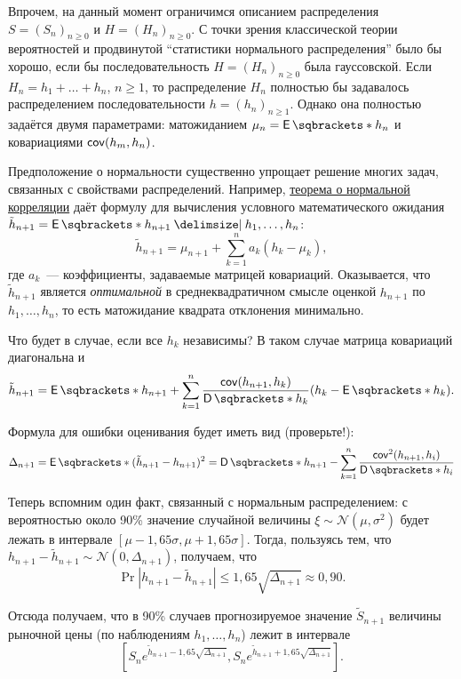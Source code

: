 Впрочем, на данный момент ограничимся описанием распределения \(S = (S_{n})_{n 
\geq 0}\) и \(H = (H_{n})_{n \geq 0}\). С точки зрения классической теории 
вероятностей и продвинутой ``статистики нормального распределения'' было бы 
хорошо, если бы последовательность \(H = (H_{n})_{n \geq 0}\) была гауссовской. 
Если \(H_{n} = h_{1} + \ldots + h_{n}\), \(n \geq 1\), то распределение 
\(H_{n}\) полностью бы задавалось распределением последовательности \(h = 
(h_{n})_{n \geq 1}\). Однако она полностью задаётся двумя параметрами: 
матожиданием \(\mu_{n} = \E{h_{n}}\) и ковариациями \(\operatorname{\mathsf{cov}}(h_{m}, h_{n})\).

Предположение о нормальности существенно упрощает решение многих задач, 
связанных с свойствами распределений. Например, 
\hyperref[normal-correlation-theorem]{теорема о нормальной корреляции} даёт 
формулу для вычисления условного математического ожидания \(\tilde{h}_{n 
+ 1} = \E{h_{n + 1} \given h_{1}, \ldots, h_{n}}\):
\[
	\tilde{h}_{n + 1} = \mu_{n + 1} + \sum_{k = 1}^{n}a_{k}(h_{k} - \mu_{k}),
\] 
где \(a_{k}\)~--- коэффициенты, задаваемые матрицей ковариаций. Оказывается, 
что \(\tilde{h}_{n + 1}\) является \emph{оптимальной} в среднеквадратичном 
смысле оценкой \(h_{n + 1}\) по \(h_{1}, \ldots, h_{n}\), то есть матожидание 
квадрата отклонения минимально.

Что будет в случае, если все \(h_{k}\) независимы? В таком случае матрица 
ковариаций диагональна и
\[
	\tilde{h}_{n + 1} = \E{h_{n + 1}} + \sum_{k = 1}^{n}\frac{\cov(h_{n + 1}, 
	h_{k})}{\D{h_{k}}}(h_{k} - \E{h_{k}}).
\]

Формула для ошибки оценивания будет иметь вид (проверьте!):
\[
	\Delta_{n + 1} = \E{(\tilde{h}_{n + 1} - h_{n + 1})^{2}} = \D{h_{n + 1}} - 
	\sum_{k = 1}^{n}\frac{\cov^{2}(h_{n + 1}, h_{i})}{\D{h_{i}}}
\]

Теперь вспомним один факт, связанный с нормальным распределением: с 
вероятностью около 90\% значение случайной величины \(\xi \sim \mathcal{N}(\mu, 
\sigma^{2})\) будет лежать в интервале \([\mu - 1,65\sigma, \mu + 
1,65\sigma]\). Тогда, пользуясь тем, что \(h_{n + 1} - \tilde{h}_{n + 1} 
\sim \mathcal{N}(0, \Delta_{n + 1})\), получаем, что
\[
	\Pr{|h_{n + 1} - \tilde{h}_{n + 1}| \leq 1,65\sqrt{\Delta_{n + 1}}} \approx 
	0,90.
\]

Отсюда получаем, что в 90\% случаев прогнозируемое значение \(\tilde{S}_{n + 
1}\) величины рыночной цены (по наблюдениям \(h_{1}, \ldots, h_{n}\)) лежит в 
интервале 
\[
	[S_{n}e^{\tilde{h}_{n + 1} - 1,65\sqrt{\Delta_{n + 1}}}, 
	S_{n}e^{\tilde{h}_{n + 1} + 1,65\sqrt{\Delta_{n + 1}}}].
\]

